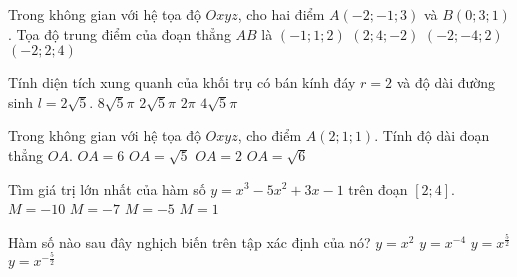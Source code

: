 \begin{ex}%
	Trong không gian với hệ tọa độ $Oxyz$, cho hai điểm $A(-2;-1;3)$ và $B(0;3;1)$. Tọa độ trung điểm của đoạn thẳng $AB$ là
	\choice
	{\True $(-1;1;2)$}
	{$(2;4;-2)$}
	{$(-2;-4;2)$}
	{$(-2;2;4)$}
\end{ex}

\begin{ex}%
	Tính diện tích xung quanh của khối trụ có bán kính đáy $r=2$ và độ dài đường sinh $l=2\sqrt5$.
	\choice
	{\True $8\sqrt5\pi$}
	{$2\sqrt5\pi$}
	{$2\pi$}
	{$4\sqrt5\pi$}
\end{ex}

\begin{ex}%
	Trong không gian với hệ tọa độ $Oxyz$, cho điểm $A(2;1;1)$. Tính độ dài đoạn thẳng $OA$.
	\choice
	{$OA=6$}
	{$OA=\sqrt5$}
	{$OA=2$}
	{\True $OA=\sqrt6$}
\end{ex}

\begin{ex}%
	Tìm giá trị lớn nhất của hàm số $y=x^3-5x^2+3x-1$ trên đoạn $[2;4]$.
	\choice
	{$M=-10$}
	{$M=-7$}
	{\True $M=-5$}
	{$M=1$}
	\loigiai{Hàm số liên tục trên $[2;4]$\\
		$y'=3x^2-10x+3$, $y'=0 \Leftrightarrow \left[\begin{matrix}x=\dfrac{1}{3}\notin \left[2;4\right] \\ x=3\in \left[2;4\right]\end{matrix}\right. $.\\
		$f(2)=-7,\ f(4)=-5,\ f(3)=-10$ nên $M=\max\limits_{[2;4]}y=-5$.
	}
\end{ex}
\begin{ex}%
	Hàm số nào sau đây nghịch biến trên tập xác định của nó?
	\choice
	{$y=x^2$}
	{$y=x^{-4}$}
	{$y=x^{\frac52}$}
	{\True $y=x^{-\frac52}$}
\end{ex}

